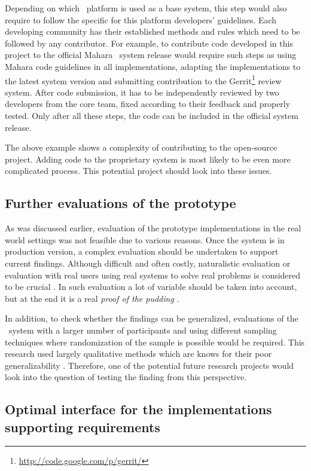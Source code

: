 Depending on which \ep~platform is used as a base system, this step would also
require to follow the specific for this platform developers' guidelines. Each
developing community has their established methods and rules which need to be
followed by any contributor. For example, to contribute code developed in this
project to the official Mahara \ep~system release would require such steps as
using Mahara code guidelines in all implementations, adapting the
implementations to the latest system version and submitting contribution to the
Gerrit\footnote{\url{http://code.google.com/p/gerrit/}} review system. After
code submission, it has to be independently reviewed by two developers from the
core team, fixed according to their feedback and properly tested. Only after all
these steps, the code can be included in the official system release.

The above example shows a complexity of contributing to the open-source project.
Adding code to the proprietary system is most likely to be even more complicated
process. This potential project should look into these issues.

\subsection{Further evaluations of the prototype}
As was discussed earlier, evaluation of the prototype implementations in the
real world settings was not feasible due to various reasons. Once the system is
in production version, a complex evaluation should be undertaken to support
current findings. Although difficult and often costly, naturalistic evaluation
or evaluation with real users using real systems to solve real problems is
considered to be crucial \citep{Pries-Heje2008}. In such evaluation a lot of
variable should be taken into account, but at the end it is a real \textit{proof
of the pudding} \citep{Venable2010}.

In addition, to check whether the findings can be generalized, evaluations of
the \ep~system with a larger number of participants and using different sampling
techniques where randomization of the sample is possible would be required. This
research used largely qualitative methods which are knows for their poor
generalizability \citep{Trochim2001}. Therefore, one of the potential future
research projects would look into the question of testing the finding from this
perspective.

\subsection[Optimal interface design]{Optimal interface for the implementations
supporting \LLLs requirements} 

